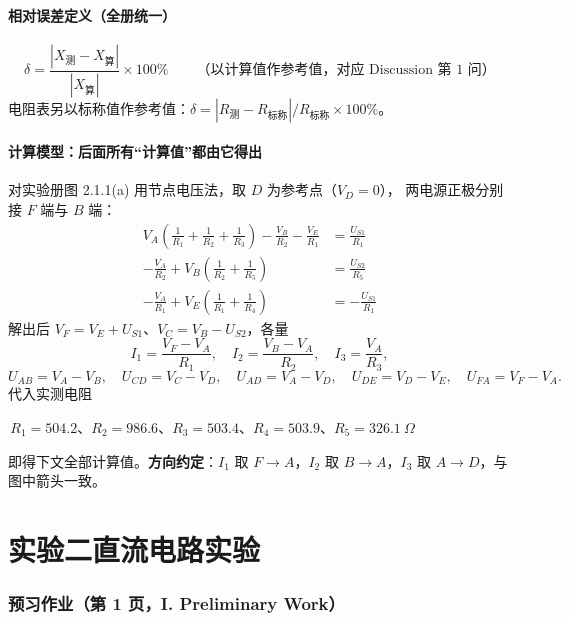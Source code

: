\documentclass[UTF8,a4paper,10.5pt]{ctexart}
\newcommand{\key}[1]{\textbf{\color{acc}#1}}
\newcommand{\cw}[1]{\colorbox{soft}{\strut\,#1\,}}
\begin{document}
\subsection{相对误差定义（全册统一）}
\begin{equation}
\delta=\frac{\left|X_{\text{测}}-X_{\text{算}}\right|}{\left|X_{\text{算}}\right|}\times100\%
\qquad\text{（以计算值作参考值，对应 Discussion 第 1 问）}
\end{equation}
电阻表另以标称值作参考值：$\delta=\left|R_{\text{测}}-R_{\text{标称}}\right|/R_{\text{标称}}\times100\%$。

\subsection{计算模型：后面所有“计算值”都由它得出}
对实验册图 2.1.1(a) 用节点电压法，取 $D$ 为参考点（$V_D=0$），
两电源正极分别接 $F$ 端与 $B$ 端：
\begin{align}
V_A\left(\tfrac1{R_1}+\tfrac1{R_2}+\tfrac1{R_3}\right)-\frac{V_B}{R_2}-\frac{V_E}{R_1}&=\frac{U_{S1}}{R_1}\\
-\frac{V_A}{R_2}+V_B\left(\tfrac1{R_2}+\tfrac1{R_5}\right)&=\frac{U_{S2}}{R_5}\\
-\frac{V_A}{R_1}+V_E\left(\tfrac1{R_1}+\tfrac1{R_4}\right)&=-\frac{U_{S1}}{R_1}
\end{align}
解出后 $V_F=V_E+U_{S1}$、$V_C=V_B-U_{S2}$，各量
\begin{equation}
I_1=\frac{V_F-V_A}{R_1},\quad I_2=\frac{V_B-V_A}{R_2},\quad I_3=\frac{V_A}{R_3},
\end{equation}
\begin{equation}
U_{AB}=V_A-V_B,\quad U_{CD}=V_C-V_D,\quad U_{AD}=V_A-V_D,\quad U_{DE}=V_D-V_E,\quad U_{FA}=V_F-V_A .
\end{equation}
代入实测电阻 \cw{$R_1=504.2$、$R_2=986.6$、$R_3=503.4$、$R_4=503.9$、$R_5=326.1\ \Omega$}
即得下文全部计算值。\key{方向约定}：$I_1$ 取 $F\to A$，$I_2$ 取 $B\to A$，$I_3$ 取 $A\to D$，与图中箭头一致。

\newpage
\part*{\centering\color{acc} 实验二\quad 直流电路实验}

\section{预习作业（第 1 页，I. Preliminary Work）}
\end{document}
